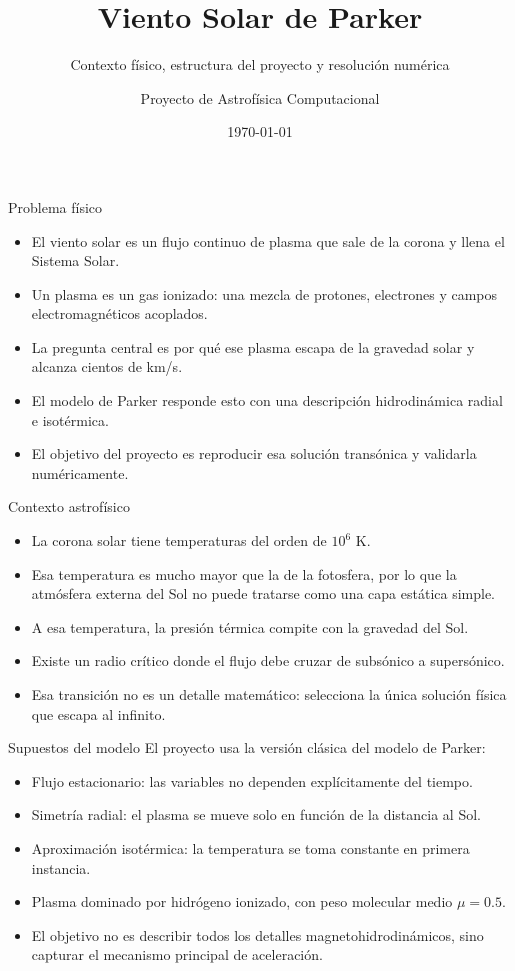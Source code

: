 \documentclass[aspectratio=169]{beamer}
\title{Viento Solar de Parker}
\subtitle{Contexto f\'isico, estructura del proyecto y resoluci\'on num\'erica}
\author{Proyecto de Astrof\'isica Computacional}
\date{\today}
\begin{document}
\begin{frame}
  \titlepage
\end{frame}

\begin{frame}{Problema f\'isico}
  \begin{itemize}
    \item El viento solar es un flujo continuo de plasma que sale de la corona y llena el Sistema Solar.
    \item Un plasma es un gas ionizado: una mezcla de protones, electrones y campos electromagn\'eticos acoplados.
    \item La pregunta central es por qu\'e ese plasma escapa de la gravedad solar y alcanza cientos de km/s.
    \item El modelo de Parker responde esto con una descripci\'on hidrodin\'amica radial e isot\'ermica.
    \item El objetivo del proyecto es reproducir esa soluci\'on trans\'onica y validarla num\'ericamente.
  \end{itemize}
\end{frame}

\begin{frame}{Contexto astrof\'isico}
  \begin{itemize}
    \item La corona solar tiene temperaturas del orden de $10^6$ K.
    \item Esa temperatura es mucho mayor que la de la fotosfera, por lo que la atm\'osfera externa del Sol no puede tratarse como una capa est\'atica simple.
    \item A esa temperatura, la presi\'on t\'ermica compite con la gravedad del Sol.
    \item Existe un radio cr\'itico donde el flujo debe cruzar de subs\'onico a supers\'onico.
    \item Esa transici\'on no es un detalle matem\'atico: selecciona la \'unica soluci\'on f\'isica que escapa al infinito.
  \end{itemize}
\end{frame}

\begin{frame}{Supuestos del modelo}
  El proyecto usa la versi\'on cl\'asica del modelo de Parker:
  \begin{itemize}
    \item Flujo estacionario: las variables no dependen expl\'icitamente del tiempo.
    \item Simetr\'ia radial: el plasma se mueve solo en funci\'on de la distancia al Sol.
    \item Aproximaci\'on isot\'ermica: la temperatura se toma constante en primera instancia.
    \item Plasma dominado por hidr\'ogeno ionizado, con peso molecular medio $\mu = 0.5$.
    \item El objetivo no es describir todos los detalles magnetohidrodin\'amicos, sino capturar el mecanismo principal de aceleraci\'on.
  \end{itemize}
\end{frame}
\end{document}
